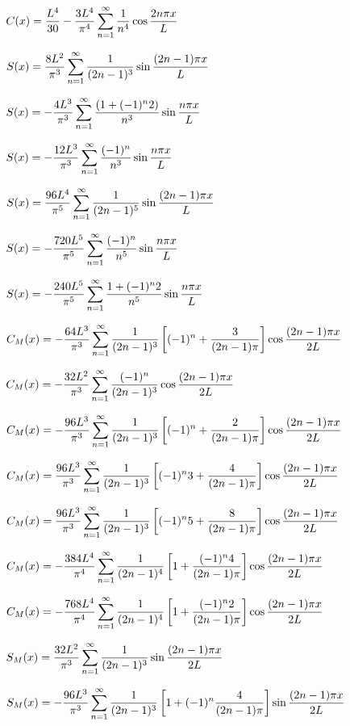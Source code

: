 $\displaystyle C(x)=\frac{L^4}{30}-\frac{3L^4}{\pi^4}\sum_{n=1}^\infty\frac{1}{n^4}\cos\frac{2n\pi x}{L}$

$S(x)=\displaystyle\frac{8L^2}{\pi^3}\sum_{n=1}^\infty\frac{1}{(2n-1)^3}
\sin\frac{(2n-1)\pi x}{L}$


$S(x)=\displaystyle-\frac{4L^3}{\pi^3}\sum_{n=1}^\infty\frac{(1+(-1)^n2)}{n^3}
\sin\frac{n\pi x}{L}$

$S(x)=\displaystyle-\frac{12L^3}{\pi^3}\sum_{n=1}^\infty\frac{(-1)^n}{n^3}
\sin\frac{n\pi x}{L}$


$S(x)=\displaystyle\frac{96L^4}{\pi^5}\sum_{n=1}^\infty\frac{1}{(2n-1)^5}\sin\frac{(2n-1)\pi
x}{L}$

$S(x)=\displaystyle-\frac{720L^5}{\pi^5}\sum_{n=1}^\infty\frac{(-1)^n}{n^5}\sin\frac{n\pi
x}{L}$

$S(x)=\displaystyle-\frac{240L^5}{\pi^5}\sum_{n=1}^\infty\frac{1+(-1)^n2}{n^5}\sin\frac{n\pi
x}{L}$

$C_M(x)=-\displaystyle\frac{64L^3}{\pi^3}\sum_{n=1}^\infty\frac{1}{(2n-1)^3}\left[
(-1)^n+\frac{3}{(2n-1)\pi}\right]\cos\frac{(2n-1)\pi
x}{2L}$


$C_M(x)=-\displaystyle
\frac{32L^2}{\pi^3}\sum_{n=1}^\infty\frac{(-1)^n}{
(2n-1)^3}\cos\frac{(2n-1)\pi x}{2L}$

$C_M(x)=-\displaystyle\frac{96L^3}{\pi^3}\sum_{n=1}^\infty\frac{1}{(2n-1)^3}\left[
(-1)^n+\frac{2}{(2n-1)\pi}\right]\cos\frac{(2n-1)\pi
x}{2L}$

$C_M(x)=\displaystyle\frac{96L^3}{\pi^3}\sum_{n=1}^\infty\frac{1}{(2n-1)^3}\left[
(-1)^n3+\frac{4}{(2n-1)\pi}\right]\cos\frac{(2n-1)\pi
x}{2L}$

$C_M(x)=\displaystyle\frac{96L^3}{\pi^3}\sum_{n=1}^\infty\frac{1}{(2n-1)^3}\left[
(-1)^n5+\frac{8}{(2n-1)\pi}\right]\cos\frac{(2n-1)\pi
x}{2L}$

$C_M(x)=-\displaystyle\frac{384L^4}{\pi^4}\sum_{n=1}^\infty\frac{1}{(2n-1)^4}\left[
1+\frac{(-1)^n4}{(2n-1)\pi}\right]\cos\frac{(2n-1)\pi
x}{2L}$

$C_M(x)=-\displaystyle\frac{768L^4}{\pi^4}\sum_{n=1}^\infty\frac{1}{(2n-1)^4}\left[
1+\frac{(-1)^n2}{(2n-1)\pi}\right]\cos\frac{(2n-1)\pi
x}{2L}$

$S_M(x)=\displaystyle
\frac{32L^2}{\pi^3}\sum_{n=1}^\infty\frac{1}{(2n-1)^3}\sin\frac{(2n-1)\pi x}{2L}$

$S_M(x)
=\displaystyle-\frac{96L^3}{\pi^3}\sum_{n=1}^\infty
\frac{1}{(2n-1)^3}\left[1+(-1)^n\frac{4}{(2n-1)\pi}\right]\sin\frac{(2n-1)\pi x
}{2L}$

